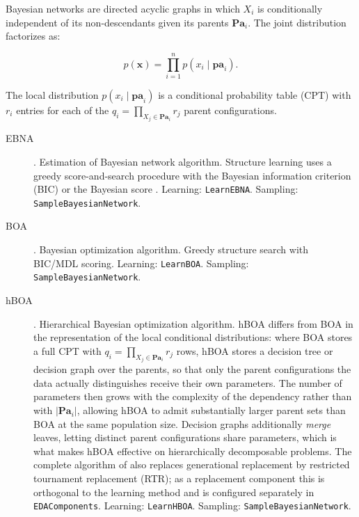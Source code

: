 \documentclass[a4paper,11pt]{article}
\begin{document}
Bayesian networks \citep{Lauritzen_and_Spiegelhalter:1988} are directed acyclic graphs in which $X_i$ is conditionally independent of its non-descendants given its parents $\mathbf{Pa}_i$.  The joint distribution factorizes as:

\begin{equation}
  p(\mathbf{x}) = \prod_{i=1}^{n} p(x_i \mid \mathbf{pa}_i).
\end{equation}

The local distribution $p(x_i \mid \mathbf{pa}_i)$ is a conditional probability table (CPT) with $r_i$ entries for each of the $q_i = \prod_{X_j \in \mathbf{Pa}_i} r_j$ parent configurations.

\begin{description}
  \item[EBNA] \citep{Etxeberria_and_Larranhaga:1999}.
    Estimation of Bayesian network algorithm.  Structure learning uses a greedy score-and-search procedure with the Bayesian information criterion (BIC) \citep{Schwarz:1978} or the Bayesian score  \citep{Cooper_and_Herskovits:1992}.
    Learning: \texttt{LearnEBNA}. Sampling: \texttt{SampleBayesianNetwork}.

  \item[BOA] \citep{Pelikan_et_al:1999,Pelikan:2005}.
    Bayesian optimization algorithm.  Greedy structure search with BIC/MDL scoring.
    Learning: \texttt{LearnBOA}. Sampling: \texttt{SampleBayesianNetwork}.

  \item[hBOA] \citep{Pelikan_and_Goldberg:2001,Pelikan:2005}.
    Hierarchical Bayesian optimization algorithm.  hBOA differs from BOA in the
    representation of the local conditional distributions: where BOA stores a full
    CPT with $q_i = \prod_{X_j \in \mathbf{Pa}_i} r_j$ rows, hBOA stores a decision
    tree or decision graph over the parents, so that only the parent configurations
    the data actually distinguishes receive their own parameters.  The number of
    parameters then grows with the complexity of the dependency rather than with
    $|\mathbf{Pa}_i|$, allowing hBOA to admit substantially larger parent sets than
    BOA at the same population size.  Decision graphs additionally \emph{merge}
    leaves, letting distinct parent configurations share parameters, which is what
    makes hBOA effective on hierarchically decomposable problems.  The complete
    algorithm of \citet{Pelikan:2005} also replaces generational replacement by
    restricted tournament replacement (RTR); as a replacement component this is
    orthogonal to the learning method and is configured separately in
    \texttt{EDAComponents}.
    Learning: \texttt{LearnHBOA}. Sampling: \texttt{SampleBayesianNetwork}.


\end{description}
\end{document}
